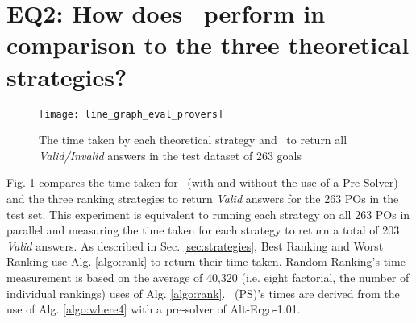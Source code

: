 \section{EQ2: How does \where~perform in comparison to the three theoretical strategies?}


\begin{figure}
	\centering
	\texttt{[image: line\_graph\_eval\_provers]}
	\caption{The time taken by each theoretical strategy and \where~to return all \textit{Valid/Invalid} answers in the test dataset of 263 goals}
	\label{fig:line_graph_eval_provers}
\end{figure}

Fig. \ref{fig:line_graph_eval_provers} compares the time taken for \where~(with and without the use of a Pre-Solver) and the three ranking strategies to return \textit{Valid} answers for the 263 POs in the test set.
This experiment is equivalent to running each strategy on all 263 POs in parallel and measuring the time taken for each strategy to return a total of 203 \textit{Valid} answers.
As described in Sec. \ref{sec:strategies}, \textsf{Best Ranking} and \textsf{Worst Ranking} use Alg. \ref{algo:rank} to return their time taken.
\textsf{Random Ranking}'s time measurement is based on the average of 40,320 (i.e. eight factorial, the number of individual rankings) uses of Alg. \ref{algo:rank}.
\where~(PS)'s times are derived from the use of Alg. \ref{algo:where4} with a pre-solver of Alt-Ergo-1.01. 

